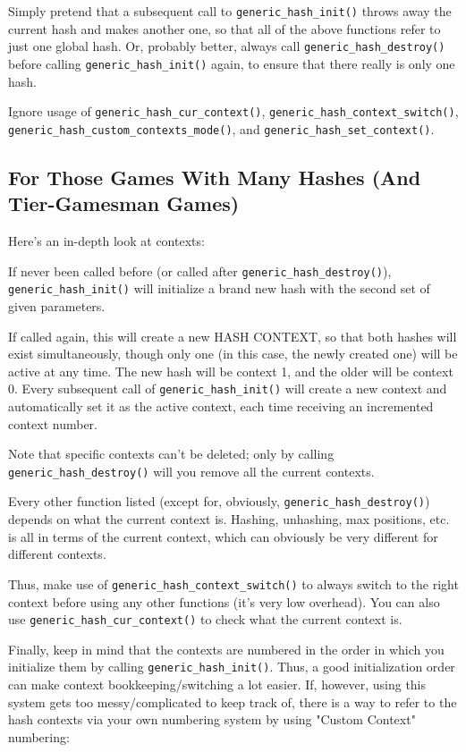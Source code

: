 \documentclass[11pt]{article}
\begin{document}
Simply pretend that a subsequent call to \texttt{generic\_hash\_init()} throws away the current hash and makes another one, so that all of the above functions refer to just one global hash. Or, probably better, always call \texttt{generic\_hash\_destroy()} before calling \texttt{generic\_hash\_init()} again, to ensure that there really is only one hash.

Ignore usage of \texttt{generic\_hash\_cur\_context()}, \texttt{generic\_hash\_context\_switch()}, \\\texttt{generic\_hash\_custom\_contexts\_mode()}, and \texttt{generic\_hash\_set\_context()}.

\subsection{For Those Games With Many Hashes (And Tier-Gamesman Games)}

Here's an in-depth look at contexts:

If never been called before (or called after \texttt{generic\_hash\_destroy()}), \texttt{generic\_hash\_init()} will initialize a brand new hash with the second set of given parameters.

If called again, this will create a new HASH CONTEXT, so that both hashes will exist simultaneously, though only one (in this case, the newly created one) will be active at any time. The new hash will be context 1, and the older will be context 0. Every subsequent call of \texttt{generic\_hash\_init()} will create a new context and automatically set it as the active context, each time receiving an incremented context number.

Note that specific contexts can't be deleted; only by calling \texttt{generic\_hash\_destroy()} will you remove all the current contexts.

Every other function listed (except for, obviously, \texttt{generic\_hash\_destroy()}) depends on what the current context is. Hashing, unhashing, max positions, etc. is all in terms of the current context, which can obviously be very different for different contexts.

Thus, make use of \texttt{generic\_hash\_context\_switch()} to always switch to the right context before using any other functions (it's very low overhead). You can also use \texttt{generic\_hash\_cur\_context()} to check what the current context is.

Finally, keep in mind that the contexts are numbered in the order in which you initialize them by calling \texttt{generic\_hash\_init()}. Thus, a good initialization order can make context bookkeeping/switching a lot easier. If, however, using this system gets too messy/complicated to keep track of, there is a way to refer to the hash contexts via your own numbering system by using "Custom Context" numbering:
\end{document}
